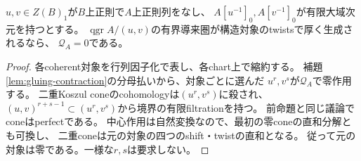 \begin{proposition}[二つの中心chartの貼合せ]
\label{prop:global-two-charts}
$u,v\in Z(B)_1$が$B$上正則で$A$上正則列をなし、
$A[u^{-1}]_0,A[v^{-1}]_0$が有限大域次元を持つとする。
$\operatorname{qgr}A/(u,v)$の有界導来圏が構造対象のtwistsで厚く生成されるなら、
$\mathcal Q_A=0$である。
\end{proposition}
\begin{proof}
各coherent対象を行列因子化で表し、各chart上で縮約する。
補題\ref{lem:gluing-contraction}の分母払いから、対象ごとに選んだ
$u^r,v^s$が$\mathcal Q_A$で零作用する。
二重Koszul coneのcohomologyは$(u^r,v^s)$に殺され、
$(u,v)^{r+s-1}\subset(u^r,v^s)$から境界の有限filtrationを持つ。
前命題と同じ議論でconeはperfectである。
中心作用は自然変換なので、最初の零coneの直和分解とも可換し、
二重coneは元の対象の四つのshift・twistの直和となる。
従って元の対象は零である。一様な$r,s$は要求しない。
\end{proof}

